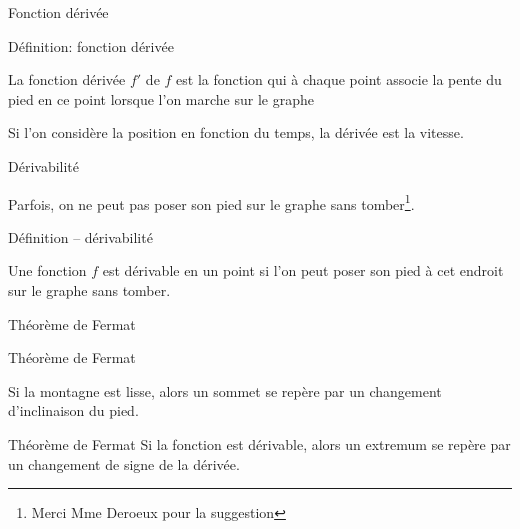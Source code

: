 \documentclass{beamer}
\begin{document}
\begin{frame}
    {Fonction dérivée}

    \begin{exampleblock}
        {Définition: fonction dérivée}

        La fonction dérivée $f'$ de $f$ est la fonction qui à chaque point
        associe la pente du pied en ce point lorsque l'on marche sur le graphe
    \end{exampleblock}
    \pause{}

    \begin{plot}{0.25}{-10}{-2}{10}{10}
    \end{plot}
    Si l'on considère la position en fonction du temps,
    la dérivée est la vitesse.
\end{frame}

\begin{frame}
    {Dérivabilité}

    Parfois,
    on ne peut pas poser son pied sur le graphe sans tomber\footnote{Merci Mme Deroeux pour la suggestion}.
    \begin{plot}{0.25}{-10}{-1}{10}{10}
    \end{plot}
    \pause{}

    \begin{exampleblock}
        {Définition -- dérivabilité}

        Une fonction $f$ est dérivable en un point si l'on peut poser son pied à cet endroit sur le graphe sans tomber.
    \end{exampleblock}
\end{frame}

\begin{frame}
    {Théorème de Fermat}

    \begin{exampleblock}
        {Théorème de Fermat}

        Si la montagne est lisse,
        alors un sommet se repère par un changement d'inclinaison du pied.
    \end{exampleblock}
    \pause{}

    \begin{alertblock}
        {Théorème de Fermat}
        Si la fonction est dérivable,
        alors un extremum se repère par un changement de signe de la dérivée.
    \end{alertblock}
\end{frame}
\end{document}
